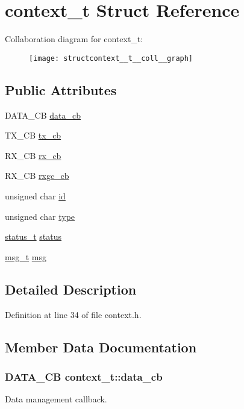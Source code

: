 \hypertarget{structcontext__t}{\section{context\-\_\-t \-Struct \-Reference}
\label{structcontext__t}
}


\-Collaboration diagram for context\-\_\-t\-:
\nopagebreak
\begin{figure}[H]
\begin{center}
\leavevmode
\texttt{[image: structcontext\_\_t\_\_coll\_\_graph]}
\end{center}
\end{figure}
\subsection*{\-Public \-Attributes}
\begin{DoxyCompactItemize}
\item 
\-D\-A\-T\-A\-\_\-\-C\-B \hyperlink{structcontext__t_ae79525e2fb5ec4ad5b6beb03c0fd9579}{data\-\_\-cb}
\item 
\-T\-X\-\_\-\-C\-B \hyperlink{structcontext__t_a06d2b435c29a01be998e6383fec2ef50}{tx\-\_\-cb}
\item 
\-R\-X\-\_\-\-C\-B \hyperlink{structcontext__t_a9d4451da3b62a2ec269ae7fd2f6b24b8}{rx\-\_\-cb}
\item 
\-R\-X\-\_\-\-C\-B \hyperlink{structcontext__t_a108cbe016d12bac90d1582ed0cca91e8}{rxgc\-\_\-cb}
\item 
unsigned char \hyperlink{structcontext__t_afcfccef1ae4111aee136acf0d92b4379}{id}
\item 
unsigned char \hyperlink{structcontext__t_a2dbb966924ef90bfba1876ad8a3872af}{type}
\item 
\hyperlink{structstatus__t}{status\-\_\-t} \hyperlink{structcontext__t_a0e49b82a79be5df63399ddbcc0cc022c}{status}
\item 
\hyperlink{structmsg__t}{msg\-\_\-t} \hyperlink{structcontext__t_ae806cd53ff68971d122ab6f854d22b8d}{msg}
\end{DoxyCompactItemize}


\subsection{\-Detailed \-Description}


\-Definition at line 34 of file context.\-h.



\subsection{\-Member \-Data \-Documentation}
\hypertarget{structcontext__t_ae79525e2fb5ec4ad5b6beb03c0fd9579}{
\subsubsection[{data\-\_\-cb}]{\setlength{\rightskip}{0pt plus 5cm}\-D\-A\-T\-A\-\_\-\-C\-B {\bf context\-\_\-t\-::data\-\_\-cb}}}\label{structcontext__t_ae79525e2fb5ec4ad5b6beb03c0fd9579}
\-Data management callback. 

